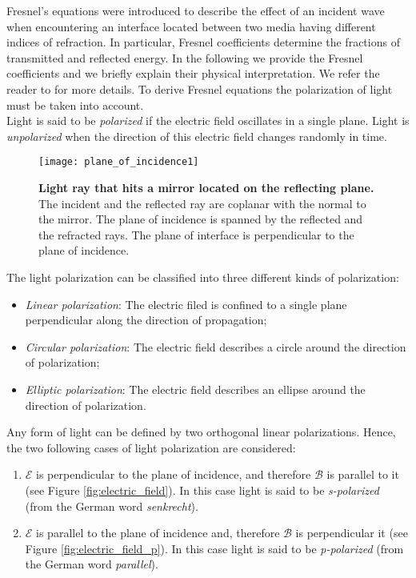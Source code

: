 \indent Fresnel's equations were introduced to describe the effect of an incident wave when encountering an interface located between two media having different indices of refraction. In particular, Fresnel coefficients determine the fractions of transmitted and reflected energy.  
In the following we provide the Fresnel coefficients and we briefly explain their physical interpretation. 
We refer the reader to \cite{born2013principles, hecht1998hecht, feynman2011feynman} for more details. To derive Fresnel equations the polarization of light must be taken into account.
\\ \indent Light is said to be \textit{polarized} if the electric field oscillates in a single plane. Light is \textit{unpolarized} when the direction of this electric field changes randomly in time.
\begin{figure}[t]
 \label{fig:planeofincidence}
     \begin{center}
     \texttt{[image: plane\_of\_incidence1]}
     \end{center}
     \caption{\textbf{Light ray that hits a mirror located on the reflecting plane.} The incident and the reflected ray are coplanar with the normal to the mirror. The plane of incidence is spanned by the reflected and the refracted rays. The plane of interface is perpendicular to the plane of incidence.}
\label{fig:planeofincidence}
 \end{figure}
The light polarization can be classified into three different kinds of polarization:
\begin{itemize}
\item \textit{Linear polarization}: The electric filed is confined to a single plane perpendicular along the direction of propagation;
\item \textit{Circular polarization}: The electric field describes a circle around the direction of polarization;
\item \textit{Elliptic polarization}: The electric field describes an ellipse around the direction of polarization.
\end{itemize}
Any form of light can be defined by two orthogonal linear polarizations.
Hence, the two following cases of light polarization are considered: 
\begin{enumerate}
\item $\boldsymbol{\mathcal{E}}$ is perpendicular to the plane of incidence, and therefore $\boldsymbol{\mathcal{B}}$ is parallel to it (see Figure \ref{fig:electric_field}). In this case light is said to be \textit{s-polarized} (from the German word \textit{senkrecht}).
\item $\boldsymbol{\mathcal{E}}$ is parallel to the plane of incidence and, therefore $\boldsymbol{\mathcal{B}}$ is perpendicular it (see Figure \ref{fig:electric_field_p}). In this case light is said to be \textit{p-polarized} (from the German word \textit{parallel}).
\end{enumerate}

